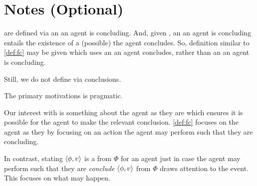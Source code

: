 

\section[Notes]{Notes \hfill (Optional)}



\begin{note}
   are defined via an  an agent is concluding.
  And, given \assuPP{}, an  an agent is concluding entails the existence of a (possible)  the agent concludes.
  So, definition similar to \autoref{def:fc} may be given which uses an  an agent concludes, rather than an  an agent is concluding.

  Still, we do not define  via conclusions.
\end{note}

\begin{note}
  The primary motivations is pragmatic.

  Our interest with  is something about the agent as they are which ensures it is possible for the agent to make the relevant conclusion.
  \autoref{def:fc} focuses on the agent as they by focusing on an action the agent may perform such that they are concluding.

  In contrast, stating \(\langle\phi, v\rangle\) is a \fc{} from \(\Phi\) for an agent just in case the agent may perform such that they are \emph{conclude} \(\langle\phi, v\rangle\) from \(\Phi\) draws attention to the event.
  This focuses on what may happen.
\end{note}

